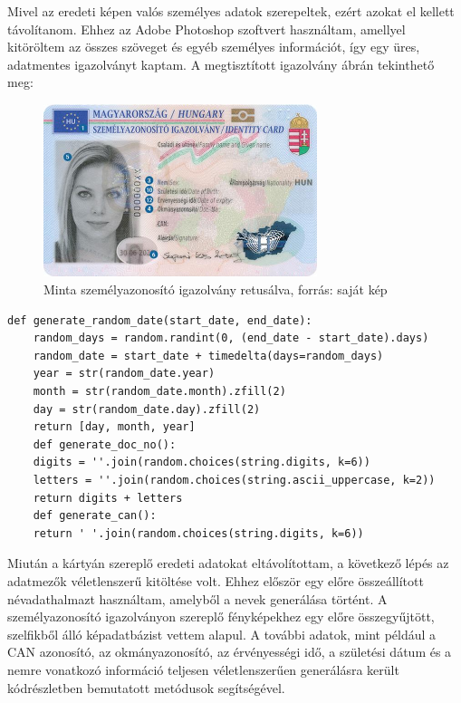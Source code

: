 \documentclass[
]{thesis-ekf}
\theoremstyle{definition}
\theoremstyle{remark}
\begin{document}
Mivel az eredeti képen valós személyes adatok szerepeltek, ezért azokat el kellett távolítanom. Ehhez az Adobe Photoshop szoftvert használtam, amellyel kitöröltem az összes szöveget és egyéb személyes információt, így egy üres, adatmentes igazolványt kaptam. A megtisztított igazolvány  ábrán tekinthető meg:

\FloatBarrier
\begin{figure}[H]
	\centering
	\includegraphics[width=8cm]{eszemelyi-front_photoshopped}
	\caption{Minta személyazonosító igazolvány retusálva, forrás: saját kép }
	\label{fig-eszemelyi-photoshopped}
\end{figure}

\begin{lstlisting}[style=mypython,caption=Augmentáció és fájlmentés, label=kod-python1]
	def generate_random_date(start_date, end_date):
	random_days = random.randint(0, (end_date - start_date).days)
	random_date = start_date + timedelta(days=random_days)
	year = str(random_date.year)
	month = str(random_date.month).zfill(2)
	day = str(random_date.day).zfill(2)
	return [day, month, year]
	def generate_doc_no():
	digits = ''.join(random.choices(string.digits, k=6))
	letters = ''.join(random.choices(string.ascii_uppercase, k=2))
	return digits + letters
	def generate_can():
	return ' '.join(random.choices(string.digits, k=6))
\end{lstlisting}

Miután a kártyán szereplő eredeti adatokat eltávolítottam, a következő lépés az adatmezők véletlenszerű kitöltése volt. Ehhez először egy előre összeállított névadathalmazt használtam, amelyből a nevek generálása történt. A személyazonosító igazolványon szereplő fényképekhez egy előre összegyűjtött, szelfikből álló képadatbázist vettem alapul. A további adatok, mint például a CAN azonosító, az okmányazonosító, az érvényességi idő, a születési dátum és a nemre vonatkozó információ teljesen véletlenszerűen generálásra került  kódrészletben bemutatott metódusok segítségével.
\end{document}

